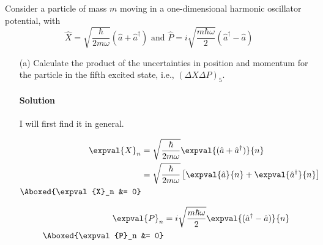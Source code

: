 \documentclass{article}
\begin{document}
	Consider a particle of mass $m$ moving in a one-dimensional harmonic oscillator potential, with
	\begin{equation}
		\hat{X} = \sqrt{\frac{\hbar}{2m\omega}} \left( \hat{a} + \hat{a}^\dagger \right) \text{ and } \hat{P} = i \sqrt{\frac{m\hbar\omega}{2}} \left( \hat{a}^\dagger - \hat{a} \right) \label{eq:4}
	\end{equation}
	\begin{enumerate}
		\item[(a)] Calculate the product of the uncertainties in position and momentum for the particle in the fifth excited state, i.e., $(\Delta X \Delta P)_5$.
		\paragraph{Solution} I will first find it in general.
		
		\begin{minipage}{0.45\textwidth}
			\begin{equation}
				\begin{split}
					\expval{X}_n &= \sqrt{\frac{\hbar}{2m\omega}} \expval{(\hat{a} + \hat{a}^\dagger)}{n} \\
					&= \sqrt{\frac{\hbar}{2m\omega}} \left[ \expval{\hat{a}}{n} + \expval{\hat{a}^\dagger}{n} \right] \\
					\Aboxed{\expval{X}_n &= 0}
				\end{split}
			\end{equation}
		\end{minipage}
		\begin{minipage}{0.45\textwidth}
			\begin{equation}
				\begin{split}
					\expval{P}_n &= i\sqrt{\frac{m\hbar\omega}{2}} \expval{(\hat{a}^\dagger - \hat{a})}{n} \\
					\Aboxed{\expval{P}_n &= 0}
				\end{split}
			\end{equation}
		\end{minipage}
		

\end{enumerate}
\end{document}
